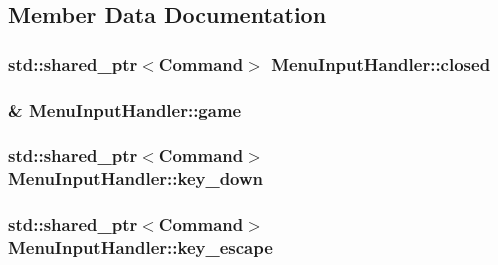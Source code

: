 \subsection{Member Data Documentation}
\hypertarget{class_menu_input_handler_a493334cca9bde4229be296ad44e3db9b}{}
\subsubsection[{closed}]{\setlength{\rightskip}{0pt plus 5cm}std\+::shared\+\_\+ptr$<${\bf Command}$>$ Menu\+Input\+Handler\+::closed\hspace{0.3cm}{\ttfamily [private]}}\label{class_menu_input_handler_a493334cca9bde4229be296ad44e3db9b}
\hypertarget{class_menu_input_handler_a49048af3c063e2b81ef6b296e9ad762c}{}
\subsubsection[{game}]{\& Menu\+Input\+Handler\+::game\hspace{0.3cm}{\ttfamily [private]}}\label{class_menu_input_handler_a49048af3c063e2b81ef6b296e9ad762c}
\hypertarget{class_menu_input_handler_a29143574ca3b79dccb3a98260184968c}{}
\subsubsection[{key\+\_\+down}]{\setlength{\rightskip}{0pt plus 5cm}std\+::shared\+\_\+ptr$<${\bf Command}$>$ Menu\+Input\+Handler\+::key\+\_\+down\hspace{0.3cm}{\ttfamily [private]}}\label{class_menu_input_handler_a29143574ca3b79dccb3a98260184968c}
\hypertarget{class_menu_input_handler_abf019bb1ca2f82975870e932e3cbd558}{}
\subsubsection[{key\+\_\+escape}]{\setlength{\rightskip}{0pt plus 5cm}std\+::shared\+\_\+ptr$<${\bf Command}$>$ Menu\+Input\+Handler\+::key\+\_\+escape\hspace{0.3cm}{\ttfamily [private]}}\label{class_menu_input_handler_abf019bb1ca2f82975870e932e3cbd558}
\hypertarget{class_menu_input_handler_aa16ab7856da1bc4c6dea371e244939fb}{}
